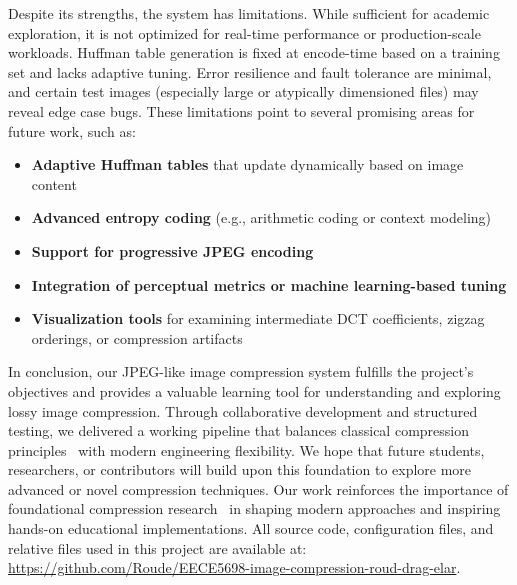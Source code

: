 Despite its strengths, the system has limitations. While sufficient for academic exploration, it is not optimized for real-time performance or production-scale workloads. Huffman table generation is fixed at encode-time based on a training set and lacks adaptive tuning. Error resilience and fault tolerance are minimal, and certain test images (especially large or atypically dimensioned files) may reveal edge case bugs. These limitations point to several promising areas for future work, such as:

\begin{itemize}
    \item \textbf{Adaptive Huffman tables} that update dynamically based on image content
    \item \textbf{Advanced entropy coding} (e.g., arithmetic coding or context modeling)
    \item \textbf{Support for progressive JPEG encoding}
    \item \textbf{Integration of perceptual metrics or machine learning-based tuning}
    \item \textbf{Visualization tools} for examining intermediate DCT coefficients, zigzag orderings, or compression artifacts
\end{itemize}

In conclusion, our JPEG-like image compression system fulfills the project’s objectives and provides a valuable learning tool for understanding and exploring lossy image compression. Through collaborative development and structured testing, we delivered a working pipeline that balances classical compression principles~\cite{jpegOverview2025} with modern engineering flexibility. We hope that future students, researchers, or contributors will build upon this foundation to explore more advanced or novel compression techniques. Our work reinforces the importance of foundational compression research~\cite{haines1992compression} in shaping modern approaches and inspiring hands-on educational implementations.
All source code, configuration files, and relative files used in this project are available at: \url{https://github.com/Roude/EECE5698-image-compression-roud-drag-elar}.